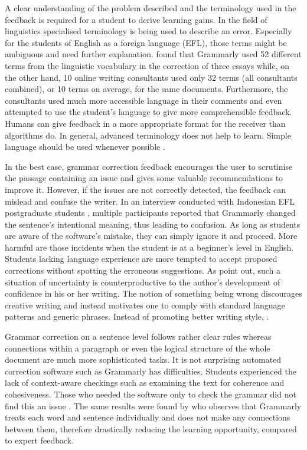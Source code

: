 \documentclass[runningheads]{llncs}
\let\OldTextregistered\textregistered
\renewcommand{\textregistered}{\OldTextregistered\xspace}
\begin{document}
A clear understanding of the problem described and the terminology used in the feedback is required for a student to derive learning gains. In the field of linguistics specialised terminology is being used to describe an error. Especially for the students of English as a foreign language (EFL), those terms might be ambiguous and need further explanation. \textcite{dembsey_closing_2017} found that Grammarly\textregistered used 52 different terms from the linguistic vocabulary in the correction of three essays while, on the other hand, 10 online writing consultants used only 32 terms (all consultants combined), or 10 terms on average, for the same documents. Furthermore, the consultants used much more accessible language in their comments and even attempted to use the student's language to give more comprehensible feedback. Humans can give feedback in a more appropriate format for the receiver than algorithms do. In general, advanced terminology does not help to learn. Simple language should be used whenever possible \citep{dembsey_closing_2017}.

In the best case, grammar correction feedback encourages the user to scrutinise the passage containing an issue and gives some valuable recommendations to improve it. However, if the issues are not correctly detected, the feedback can mislead and confuse the writer. In an interview conducted with Indonesian EFL postgraduate students \citep{nova_utilizing_2018}, multiple participants reported that Grammarly\textregistered changed the sentence's intentional meaning, thus leading to confusion. As long as students are aware of the software's mistake, they can simply ignore it and proceed. More harmful are those incidents when the student is at a beginner's level in English. Students lacking language experience are more tempted to accept proposed corrections without spotting the erroneous suggestions. As \textcite{vojak_new_2011} point out, such a situation of uncertainty is counterproductive to the author's development of confidence in his or her writing. The notion of something being wrong discourages creative writing and instead motivates one to comply with standard language patterns and generic phrases. Instead of promoting better writing style, \citeauthor{vojak_new_2011} . 

Grammar correction on a sentence level follows rather clear rules whereas connections within a paragraph or even the logical structure of the whole document are much more sophisticated tasks. It is not surprising automated correction software such as Grammarly\textregistered has difficulties. Students experienced the lack of context-aware checkings such as examining the text for coherence and cohesiveness. Those who needed the software only to check the grammar did not find this an issue \citep{nova_utilizing_2018}. The same results were found by \textcite{dembsey_closing_2017} who observes that Grammarly\textregistered treats each word and sentence individually and does not make any connections between them, therefore drastically reducing the learning opportunity, compared to expert feedback.
\end{document}
